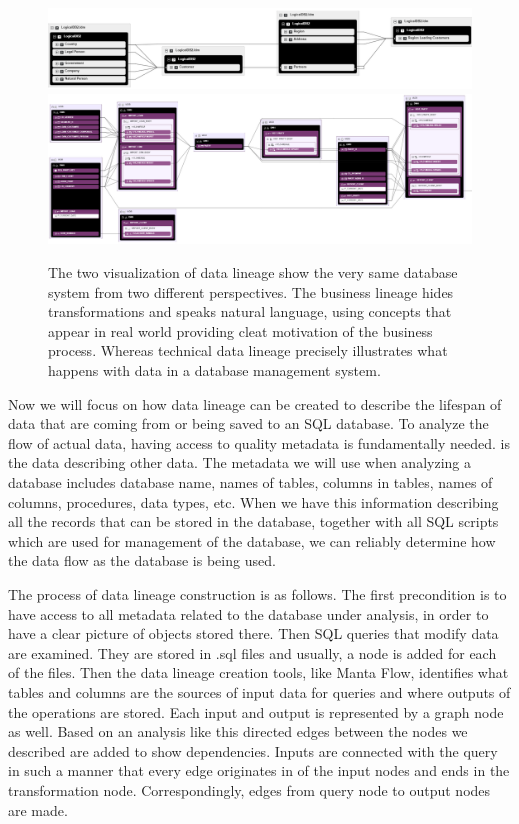 \begin{figure}[H]
	\centering
	\includegraphics[width=14cm]{../img/BusinessLineage}
	\includegraphics[width=14cm]{../img/TechnicalLineage}
	\caption[Technical Lineage versus Business Lineage]{The two visualization of data lineage show the very same database system from two different perspectives. The business lineage hides transformations and speaks natural language, using concepts that appear in real world providing cleat motivation of the business process. 
		Whereas technical data lineage precisely illustrates what happens with data in a database management system.}
	\label{BusinessVsTechnicalLineage}
\end{figure}

Now we will focus on how data lineage can be created to describe the lifespan of data that are coming from or being saved to an SQL database.
To analyze the flow of actual data, having access to quality metadata is fundamentally needed.
 is the data describing other data. The metadata we will use when analyzing a database includes database name, names of tables, columns in tables, names of columns, procedures, data types, etc.
When we have this information describing all the records that can be stored in the database, together with all SQL scripts which are used for management of the database, we can reliably determine how the data flow as the database is being used.

The process of data lineage construction is as follows. The first precondition is to have access to all metadata related to the database under analysis, in order to have a clear picture of objects stored there. 
Then SQL queries that modify data are examined. They are stored in .sql files and usually, a node is added for each of the files. Then the data lineage creation tools, like Manta Flow, identifies what tables and columns are the sources of input data for queries and where outputs of the operations are stored. Each input and output is represented by a graph node as well. Based on an analysis like this directed edges between the nodes we described are added to show dependencies. Inputs are connected with the query in such a manner that every edge originates in of the input nodes and ends in the transformation node. Correspondingly, edges from query node to output nodes are made.


